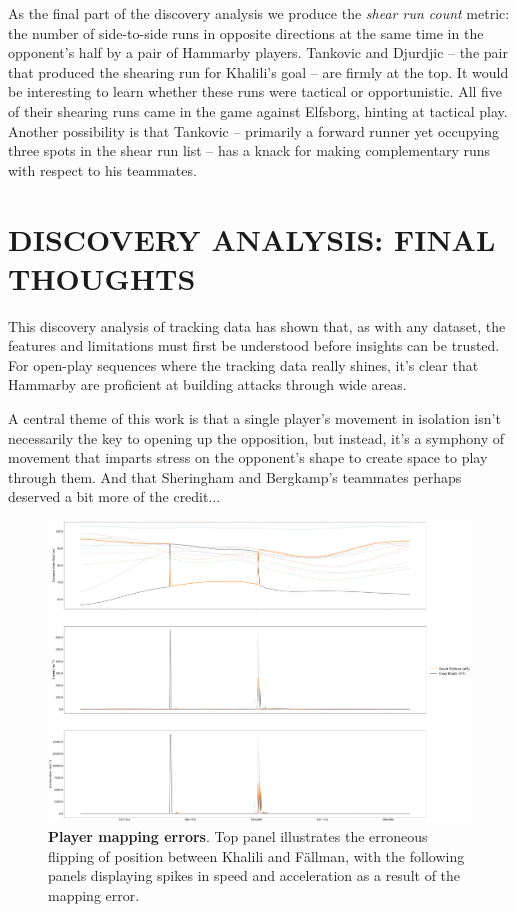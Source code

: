 \documentclass[twocolumn,prl,nobalancelastpage,aps,10pt]{revtex4-1}
\begin{document}
As the final part of the discovery analysis we produce the \textit{shear run count} metric: the number of side-to-side runs in opposite directions at the same time in the opponent's half by a pair of Hammarby players. Tankovic and Djurdjic -- the pair that produced the shearing run for Khalili's goal -- are firmly at the top. It would be interesting to learn whether these runs were tactical or opportunistic. All five of their shearing runs came in the game against Elfsborg, hinting at tactical play. Another possibility is that Tankovic -- primarily a forward runner yet occupying three spots in the shear run list -- has a knack for making complementary runs with respect to his teammates.



\section{DISCOVERY ANALYSIS: FINAL THOUGHTS}

This discovery analysis of tracking data has shown that, as with any dataset, the features and limitations must first be understood before insights can be trusted. For open-play sequences where the tracking data really shines, it's clear that Hammarby are proficient at building attacks through wide areas.

A central theme of this work is that a single player's movement in isolation isn't necessarily the key to opening up the opposition, but instead, it's a symphony of movement that imparts stress on the opponent's shape to create space to play through them. And that Sheringham and Bergkamp's teammates perhaps deserved a bit more of the credit...






\begin{figure}
\includegraphics*[width=0.96\linewidth,clip]{MappingError}
\caption{\textbf{Player mapping errors}. Top panel illustrates the erroneous flipping of position between Khalili and F{\"a}llman, with the following panels displaying spikes in speed and acceleration as a result of the mapping error.}
\label{mapping}
\end{figure}
\end{document}
